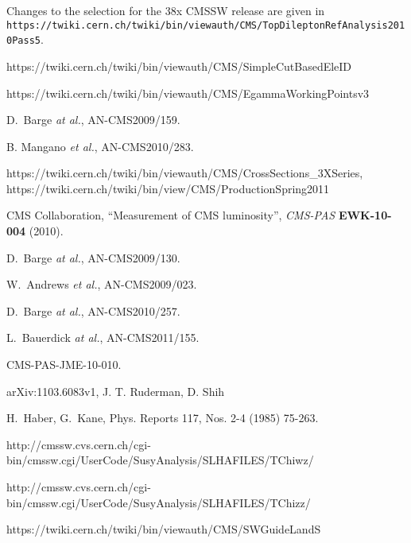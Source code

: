 \begin{thebibliography}{10}
 Changes to the selection for the 38x CMSSW release are given in 
{\tt https://twiki.cern.ch/twiki/bin/viewauth/CMS/TopDileptonRefAnalysis2010Pass5}.

 https://twiki.cern.ch/twiki/bin/viewauth/CMS/SimpleCutBasedEleID

 https://twiki.cern.ch/twiki/bin/viewauth/CMS/EgammaWorkingPointsv3

 D.~Barge {\em at al.}, AN-CMS2009/159.

 B. Mangano {\em et al.}, %
AN-CMS2010/283.

 https://twiki.cern.ch/twiki/bin/viewauth/CMS/CrossSections\_3XSeries, 
https://twiki.cern.ch/twiki/bin/view/CMS/ProductionSpring2011

{CMS Collaboration}, ``Measurement of CMS luminosity'', {\em CMS-PAS} {\bf
  EWK-10-004} (2010).

 D.~Barge {\em at al.}, AN-CMS2009/130.

 W.~Andrews {\em et al.}, AN-CMS2009/023.

 D.~Barge {\em at al.}, AN-CMS2010/257.

 L.~Bauerdick {\em at al.}, AN-CMS2011/155.

 CMS-PAS-JME-10-010.

 arXiv:1103.6083v1, J. T. Ruderman, D. Shih

H.~Haber, G.~Kane, Phys. Reports 117, Nos. 2-4 (1985) 75-263.

 http://cmssw.cvs.cern.ch/cgi-bin/cmssw.cgi/UserCode/SusyAnalysis/SLHAFILES/TChiwz/

 http://cmssw.cvs.cern.ch/cgi-bin/cmssw.cgi/UserCode/SusyAnalysis/SLHAFILES/TChizz/

 https://twiki.cern.ch/twiki/bin/viewauth/CMS/SWGuideLandS

\end{thebibliography}
